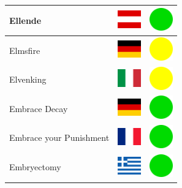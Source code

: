 \documentclass[12pt, a4paper, twoside]{report}
\begin{document}
\begin{center}
\begin{longtable}{|p{5cm}|p{2cm}|p{2cm}|}
Ellende & \includegraphics[width=1cm]{4x3/at} & \includegraphics[width=1cm]{likes/y} \\ \hline
Elmsfire & \includegraphics[width=1cm]{4x3/de} & \includegraphics[width=1cm]{likes/m} \\ \hline
Elvenking & \includegraphics[width=1cm]{4x3/it} & \includegraphics[width=1cm]{likes/m} \\ \hline
Embrace Decay & \includegraphics[width=1cm]{4x3/de} & \includegraphics[width=1cm]{likes/y} \\ \hline
Embrace your Punishment & \includegraphics[width=1cm]{4x3/fr} & \includegraphics[width=1cm]{likes/y} \\ \hline
Embryectomy & \includegraphics[width=1cm]{4x3/gr} & \includegraphics[width=1cm]{likes/y} \\ \hline

\end{longtable}
\end{center}
\end{document}
